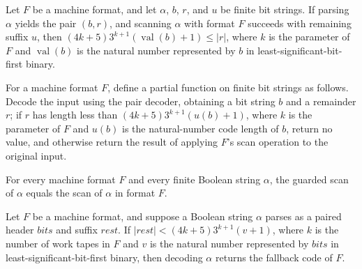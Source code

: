 \begin{lemma}
\label{Turing.MachineFormat.scan_grammar_guard}
\leanok
{}
Let $F$ be a machine format, and let $\alpha$, $b$, $r$, and $u$ be finite bit strings.
If parsing $\alpha$ yields the pair $(b,r)$, and scanning $\alpha$ with format $F$
succeeds with remaining suffix $u$, then $(4k+5)3^{k+1}(\operatorname{val}(b)+1)\le
|r|$, where $k$ is the parameter of $F$ and $\operatorname{val}(b)$ is the natural
number represented by $b$ in least-significant-bit-first binary.
\end{lemma}

\begin{definition}
\label{Turing.MachineFormat.guardedScan}
\leanok
{}
For a machine format $F$, define a partial function on finite bit strings as follows.
Decode the input using the pair decoder, obtaining a bit string $b$ and a remainder $r$;
if $r$ has length less than $(4k+5)3^{k+1}(
u(b)+1)$, where $k$ is the parameter of $F$ and $
u(b)$ is the natural-number code length of $b$, return no value, and otherwise return
the result of applying $F$’s scan operation to the original input.
\end{definition}

\begin{lemma}
\label{Turing.MachineFormat.guardedScan_eq}
\leanok
{}
For every machine format $F$ and every finite Boolean string $\alpha$, the guarded scan
of $\alpha$ equals the scan of $\alpha$ in format $F$.
\end{lemma}

\begin{lemma}
\label{Turing.MachineFormat.decode_of_grammar_guard}
\leanok
{}
Let $F$ be a machine format, and suppose a Boolean string $\alpha$ parses as a paired
header $bits$ and suffix $rest$. If $|rest| < (4k+5)3^{k+1}(v+1)$, where $k$ is the
number of work tapes in $F$ and $v$ is the natural number represented by $bits$ in
least-significant-bit-first binary, then decoding $\alpha$ returns the fallback code of
$F$.
\end{lemma}

